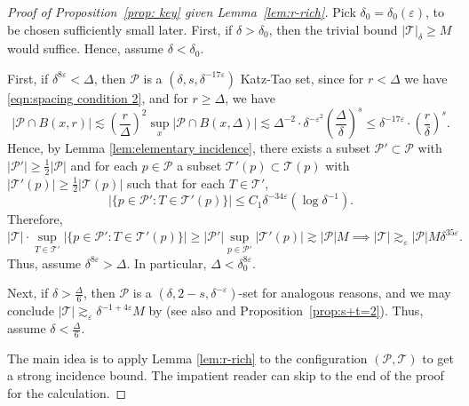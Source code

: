 \documentclass{amsart}
\newcommand{\T}{\mathcal{T}}
\newcommand{\eps}{\varepsilon}
\newcommand{\lesim}{\lesssim}
\newcommand{\gesim}{\gtrsim}
\newcommand{\cT}{\mathcal{T}}
\newcommand{\cP}{\mathcal{P}}
\begin{document}
\begin{proof}[Proof of Proposition~\ref{prop: key} given Lemma~\ref{lem:r-rich}]
    Pick $\delta_0 = \delta_0 (\eps)$, to be chosen sufficiently small later. First, if $\delta > \delta_0$, then the trivial bound $|\T|_\delta \ge M$ would suffice. Hence, assume $\delta < \delta_0$.

    First, if $\delta^{8\eps} < \Delta$, then $\cP$ is a $(\delta, s, \delta^{-17\eps})$ Katz-Tao set, since for $r < \Delta$ we have \eqref{eqn:spacing condition 2}, and for $r \ge \Delta$, we have
    \begin{equation*}
        |\cP \cap B(x, r)| \lesim \left( \frac{r}{\Delta} \right)^2 \sup_x |\cP \cap B(x, \Delta)| \lesim \Delta^{-2} \cdot \delta^{-\eps^2} \left( \frac{\Delta}{\delta} \right)^s \le \delta^{-17\eps} \cdot \left( \frac{r}{\delta} \right)^s.
    \end{equation*}
    Hence, by Lemma \ref{lem:elementary incidence}, there exists a subset $\cP'\subset\cP$ with $|\cP'|\geq \frac{1}{2}|\cP|$ and for each $p\in \cP$ a subset $\cT'(p)\subset \cT(p)$ with $|\cT'(p)|\geq \frac{1}{2}|\cT(p)|$ such that for each $T\in \cT'$, 
    \[
    |\{p\in \cP': T\in \cT'(p)\}|\leq C_1 \delta^{-34\eps} (\log \delta^{-1}).
    \]
    Therefore, 
    \begin{equation*}
        |\T| \cdot \sup_{T \in \T'} |\{ p \in \cP' : T \in \T'(p) \}| \ge |\cP'| \sup_{p \in \cP'} |\T'(p)| \gesim |\cP| M \implies |\T| \gtrsim_{\eps} |\cP| M \delta^{35\eps}.
    \end{equation*}
    Thus, assume $\delta^{8\eps} > \Delta$. In particular, $\Delta < \delta_0^{8\eps}$.

    Next, if $\delta > \frac{\Delta}{6}$, then $\cP$ is a $(\delta, 2-s, \delta^{-\eps})$-set for analogous reasons, and we may conclude $|\T| \gesim_\eps \delta^{-1+4\eps} M$ by \cite[Theorem 5.28]{orponen2023projections} (see also \cite[Theorem 5.2]{fu2021incidence} and Proposition~\ref{prop:s+t=2}). Thus, assume $\delta < \frac{\Delta}{6}$.

    The main idea is to apply Lemma \ref{lem:r-rich} to the configuration $(\cP, \cT)$ to get a strong incidence bound. The impatient reader can skip to the end of the proof for the calculation.


\end{proof}
\end{document}
